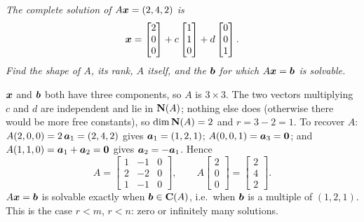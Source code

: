 \begin{example}\label{ex:u14-recover}
\emph{The complete solution of $A\boldsymbol{x}=(2,4,2)$ is}
\[
\boldsymbol{x}=\begin{bmatrix}2\\0\\0\end{bmatrix}+c\begin{bmatrix}1\\1\\0\end{bmatrix}+d\begin{bmatrix}0\\0\\1\end{bmatrix}.
\]
\emph{Find the shape of $A$, its rank, $A$ itself, and the $\boldsymbol{b}$ for which $A\boldsymbol{x}=\boldsymbol{b}$ is
solvable.}

$\boldsymbol{x}$ and $\boldsymbol{b}$ both have three components, so $A$ is $3\times3$. The two vectors multiplying
$c$ and $d$ are independent and lie in $\mathbf{N}(A)$; nothing else does (otherwise there would be more
free constants), so $\dim\mathbf{N}(A)=2$ and $r=3-2=1$. To recover $A$: $A(2,0,0)=2\,\boldsymbol{a}_1=(2,4,2)$
gives $\boldsymbol{a}_1=(1,2,1)$; $A(0,0,1)=\boldsymbol{a}_3=\boldsymbol{0}$; and $A(1,1,0)=\boldsymbol{a}_1+\boldsymbol{a}_2=\boldsymbol{0}$ gives
$\boldsymbol{a}_2=-\boldsymbol{a}_1$. Hence
\[
A=\begin{bmatrix}1&-1&0\\2&-2&0\\1&-1&0\end{bmatrix},\qquad
A\begin{bmatrix}2\\0\\0\end{bmatrix}=\begin{bmatrix}2\\4\\2\end{bmatrix}.
\]
$A\boldsymbol{x}=\boldsymbol{b}$ is solvable exactly when $\boldsymbol{b}\in\mathbf{C}(A)$, i.e.\ when $\boldsymbol{b}$ is a multiple of
$(1,2,1)$. This is the case $r<m$, $r<n$: zero or infinitely many solutions.
\end{example}

